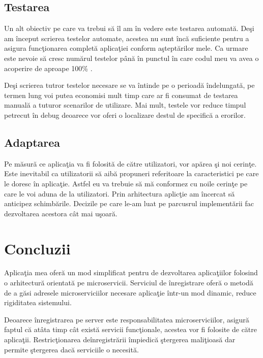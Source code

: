 \documentclass[a4paper,12pt]{report}
\begin{document}
\section{Testarea }

Un alt obiectiv pe care va trebui s\u a \^il am \^in vedere este testarea automat\u a.
De\c si am \^inceput scrierea testelor automate, acestea nu sunt \^inc\u a suficiente pentru 
a asigura func\c tionarea complet\u a aplica\c tiei conform a\c stept\u arilor mele.
Ca urmare este nevoie s\u a cresc num\u arul testelor p\^an\u a \^in punctul \^in care 
codul meu va avea o acoperire de aproape 100\% .

De\c si scrierea tutror testelor necesare 
se va \^intinde pe o perioad\u a \^indelungat\u a, pe termen lung voi putea economisi mult timp
care ar fi consumat de testarea manual\u a a tuturor scenarilor de utilizare. Mai mult,
testele vor reduce timpul petrecut \^in debug deoarece vor oferi o localizare destul de specific\u a
a erorilor. 

\section{Adaptarea}

Pe m\u asur\u a ce aplica\c tia va fi folosit\u a de c\u atre utilizatori, 
vor ap\u area \c si noi cerin\c te. Este inevitabil ca utilizatorii 
s\u a aib\u a propuneri referitoare la caracteristici pe care le doresc 
\^in aplica\c tie. Astfel eu va trebuie s\u a m\u a conformez cu noile 
cerin\c te pe care le voi aduna de la utilizatori. Prin arhitectura aplic\c tie 
am \^incercat s\u a anticipez schimb\u arile. Decizile pe care le-am luat pe parcusrul 
implement\u arii  fac dezvoltarea acestora 
c\^at mai u\c soar\u a.

\chapter{Concluzii}

Aplica\c tia mea ofer\u a un mod simplificat pentru de dezvoltarea aplica\c tiilor 
folosind o arhitectur\u a orientat\u a pe microservicii.
Serviciul de \^inregistrare ofer\u a o metod\u a de a g\u asi adresele microserviciilor necesare aplica\c tie 
\^intr-un mod dinamic, reduce rigiditatea sistemului.

Deoarece \^inregistrarea pe server este responsabilitatea microserviciilor, 
asigur\u a faptul c\u a at\^ata timp c\^at exist\u a servicii func\c tionale,
acestea vor fi folosite de c\u atre aplica\c tii. Restric\c tionarea de\^inregistr\u arii
\^impiedic\u a \c stergerea mali\c tioas\u a dar permite \c stergerea dac\u a serviciile 
o necesit\u a.
\end{document}
